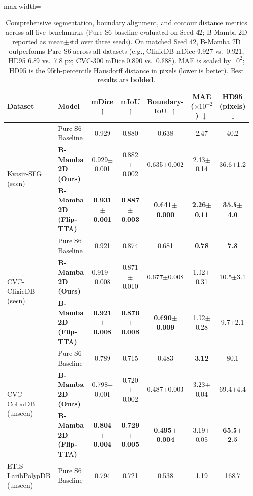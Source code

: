 \documentclass[journal]{IEEEtran}
\begin{document}
\begin{table}[t]
\centering
\caption{Comprehensive segmentation, boundary alignment, and contour distance metrics across all five benchmarks (Pure S6 baseline evaluated on Seed 42; B-Mamba 2D reported as mean$\pm$std over three seeds). On matched Seed 42, B-Mamba 2D outperforms Pure S6 across all datasets (e.g., ClinicDB mDice 0.927 vs.\ 0.921, HD95 6.89 vs.\ 7.8 px; CVC-300 mDice 0.890 vs.\ 0.888). MAE is scaled by $10^2$; HD95 is the 95th-percentile Hausdorff distance in pixels (lower is better). Best results are \textbf{bolded}.}
\label{tab:metrics_detail}
\begin{adjustbox}{max width=\textwidth}
\begin{tabular}{l l c c c c c}
\toprule
Dataset & Model & mDice $\uparrow$ & mIoU $\uparrow$ & Boundary-IoU $\uparrow$ & MAE ($\times 10^{-2}$) $\downarrow$ & HD95 (pixels) $\downarrow$ \\
\midrule
\multirow{3}{*}{Kvasir-SEG (seen)} 
 & Pure S6 Baseline & 0.929 & 0.880 & 0.638 & 2.47 & 40.2 \\
 & \textbf{B-Mamba 2D (Ours)} & 0.929$\pm$0.001 & 0.882$\pm$0.002 & 0.635$\pm$0.002 & 2.43$\pm$0.14 & 36.6$\pm$1.2 \\
 & \textbf{B-Mamba 2D (Flip-TTA)}  & \textbf{0.931$\pm$0.001} & \textbf{0.887$\pm$0.003} & \textbf{0.641$\pm$0.000} & \textbf{2.26$\pm$0.11} & \textbf{35.5$\pm$4.0} \\
\midrule
\multirow{3}{*}{CVC-ClinicDB (seen)} 
 & Pure S6 Baseline & 0.921 & 0.874 & 0.681 & \textbf{0.78} & \textbf{7.8} \\
 & \textbf{B-Mamba 2D (Ours)} & 0.919$\pm$0.008 & 0.871$\pm$0.010 & 0.677$\pm$0.008 & 1.02$\pm$0.31 & 10.5$\pm$3.1 \\
 & \textbf{B-Mamba 2D (Flip-TTA)}  & \textbf{0.921$\pm$0.008} & \textbf{0.876$\pm$0.008} & \textbf{0.690$\pm$0.009} & 1.02$\pm$0.28 & 9.7$\pm$2.1 \\
\midrule
\multirow{3}{*}{CVC-ColonDB (unseen)} 
 & Pure S6 Baseline & 0.789 & 0.715 & 0.483 & \textbf{3.12} & 80.1 \\
 & \textbf{B-Mamba 2D (Ours)} & 0.798$\pm$0.001 & 0.720$\pm$0.002 & 0.487$\pm$0.003 & 3.23$\pm$0.04 & 69.4$\pm$4.4 \\
 & \textbf{B-Mamba 2D (Flip-TTA)}  & \textbf{0.804$\pm$0.004} & \textbf{0.729$\pm$0.005} & \textbf{0.495$\pm$0.004} & 3.19$\pm$0.05 & \textbf{65.5$\pm$2.5} \\
\midrule
\multirow{3}{*}{ETIS-LaribPolypDB (unseen)} 
 & Pure S6 Baseline & 0.794 & 0.721 & 0.538 & 1.19 & 168.7 \\

\end{tabular}
\end{adjustbox}
\end{table}
\end{document}
